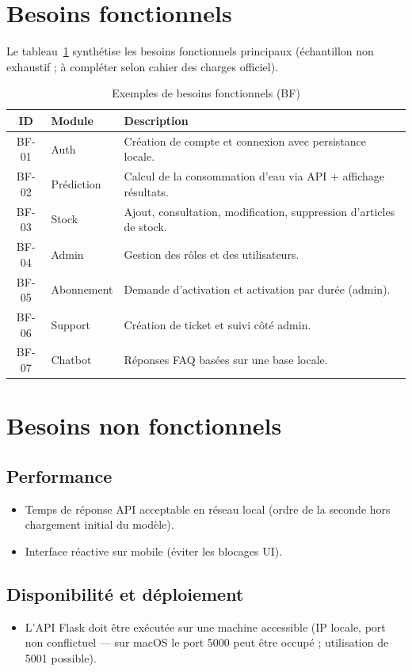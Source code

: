 \documentclass[12pt,a4paper,twoside,openright]{report}
\begin{document}
\section{Besoins fonctionnels}

Le tableau~\ref{tab:bf} synthétise les besoins fonctionnels principaux (échantillon non exhaustif ; à compléter selon cahier des charges officiel).

\begin{table}[H]
  \centering
  \caption{Exemples de besoins fonctionnels (BF)}
  \label{tab:bf}
  \begin{tabular}{@{}clp{8cm}@{}}
    \toprule
    \textbf{ID} & \textbf{Module} & \textbf{Description} \\
    \midrule
    BF-01 & Auth & Création de compte et connexion avec persistance locale. \\
    BF-02 & Prédiction & Calcul de la consommation d'eau via API + affichage résultats. \\
    BF-03 & Stock & Ajout, consultation, modification, suppression d'articles de stock. \\
    BF-04 & Admin & Gestion des rôles et des utilisateurs. \\
    BF-05 & Abonnement & Demande d'activation et activation par durée (admin). \\
    BF-06 & Support & Création de ticket et suivi côté admin. \\
    BF-07 & Chatbot & Réponses FAQ basées sur une base locale. \\
    \bottomrule
  \end{tabular}
\end{table}

\section{Besoins non fonctionnels}

\subsection{Performance}
\begin{itemize}
  \item Temps de réponse API acceptable en réseau local (ordre de la seconde hors chargement initial du modèle).
  \item Interface réactive sur mobile (éviter les blocages UI).
\end{itemize}

\subsection{Disponibilité et déploiement}
\begin{itemize}
  \item L'API Flask doit être exécutée sur une machine accessible (IP locale, port non conflictuel — sur macOS le port 5000 peut être occupé ; utilisation de 5001 possible).
\end{itemize}
\end{document}
